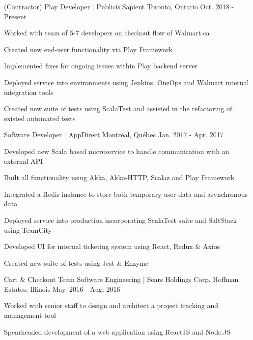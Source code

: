 \begin{cventries}
    {(Contractor)  Play Developer | Publicis.Sapient}
    {Toronto, Ontario}
    {Oct. 2018 - Present}
    {
      \begin{cvitems}
        \item {Worked with team of 5-7  developers on checkout flow of Walmart.ca}
        \item {Created new end-user functionality via Play Framework}
        \item {Implemented fixes for ongoing issues within Play backend server}
        \item {Deployed service into environments using Jenkins, OneOps and Walmart internal integration tools}
        \item {Created new suite of tests using ScalaTest and assisted in the refactoring of existed automated tests}
      \end{cvitems}
    }
    {Software Developer | AppDirect}
    {Montréal, Québec}
    {Jan. 2017 - Apr. 2017 }
    {
      \begin{cvitems}
        \item {Developed new Scala based microservice to handle communication with an external API}
        \item {Built all functionality using Akka, Akka-HTTP, Scalaz and Play Framework}
        \item {Integrated a Redis instance to store both temporary user data and asynchronous data}
        \item {Deployed service into production incorporating ScalaTest suite and SaltStack using TeamCity}
        \item {Developed UI for internal ticketing system using React, Redux \& Axios}
        \item {Created new suite of tests using Jest \& Enzyme}
      \end{cvitems}
    }
    \cventry
    {Cart \& Checkout Team}
    {Software Engineering | Sears Holdings Corp.}
    {Hoffman Estates, Illinois}
    {May. 2016 - Aug. 2016}
    {
      \begin{cvitems}
        \item {Worked with senior staff to design and architect a project tracking and management tool}
       \item {Spearheaded development of a web application using ReactJS and Node.JS}

\end{cvitems}}
\end{cventries}
